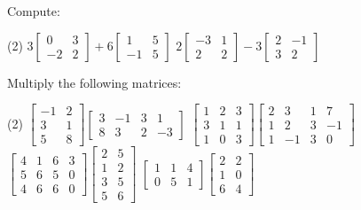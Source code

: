 \begin{exercise}
Compute:
\begin{tasks}(2)
\task
$3\begin{bmatrix}
0 & 3 \\
-2 & 2
\end{bmatrix}
+
6
\begin{bmatrix}
1 & 5 \\
-1 & 5
\end{bmatrix}$
\task
$2\begin{bmatrix}
-3 & 1 \\
2 & 2
\end{bmatrix}
-
3
\begin{bmatrix}
2 & -1 \\
3 & 2
\end{bmatrix}$
\end{tasks}
\end{exercise}

\begin{exercise}
Multiply the following matrices:
\begin{tasks}(2)
\task
$\begin{bmatrix}
-1 & 2 \\
3 & 1 \\
5 & 8
\end{bmatrix}
\begin{bmatrix}
3 & -1 & 3 & 1 \\
8 & 3 & 2 & -3
\end{bmatrix}$
\task
$\begin{bmatrix}
1 & 2 & 3 \\
3 & 1 & 1 \\
1 & 0 & 3
\end{bmatrix}
\begin{bmatrix}
2 & 3 & 1 & 7 \\
1 & 2 & 3 & -1 \\
1 & -1 & 3 & 0
\end{bmatrix}$
\task
$\begin{bmatrix}
4 & 1 & 6 & 3 \\
5 & 6 & 5 & 0 \\
4 & 6 & 6 & 0
\end{bmatrix}
\begin{bmatrix}
2 & 5 \\
1 & 2 \\
3 & 5 \\
5 & 6
\end{bmatrix}$
\task
$\begin{bmatrix}
1 & 1 & 4 \\
0 & 5 & 1
\end{bmatrix}
\begin{bmatrix}
2 & 2 \\
1 & 0 \\
6 & 4
\end{bmatrix}$
\end{tasks}
\end{exercise}

